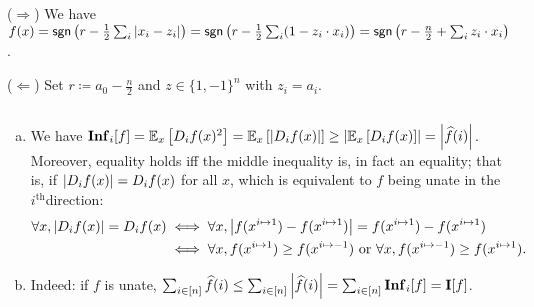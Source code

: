 \documentclass[12pt]{article}
\newcommand{\fbitset}{\{1,-1\}}
\newcommand{\E}[2][]{\mathbb E_{#1}\left[#2\right]}
\newcommand{\Inf}{\mathbf{Inf}}
\newcommand{\I}{\mathbf{I}}
\newcommand{\ith}{$i^\text{th}$}
\newcommand{\hf}{\widehat{f}}
\newcommand{\sumi}{\sum_{i \in [n]}}
\begin{document}
\subsection{}
($\Longrightarrow$) We have $f(x) = \textsf{sgn}\left(r - \frac1{2}\sum_i \abs{x_i - z_i}\right) = \textsf{sgn}\left(r - \frac1{2}\sum_i (1 - z_i \cdot x_i)\right) = \textsf{sgn}\left(r - \frac{n}{2} + \sum_i z_i \cdot x_i\right)$.

\noindent ($\Longleftarrow$) Set $r \coloneqq a_0 - \frac{n}{2}$ and $z \in \fbitset^n$ with $z_i = a_i$.

\subsection{}
\begin{enumerate}[(a)]
    \item We have $\Inf_i[f] = \E[x]{D_i f(x)^2} = \E[x]{\abs{D_i f(x)}} \geq \abs{\E[x]{D_i f(x)}} = \abs{\hf(i)}$. Moreover, equality holds iff the middle inequality is, in fact an equality; that is, if $\abs{D_i f(x)} = D_i f(x)$ for all $x$, which is equivalent to $f$ being unate in the \ith direction:
    \begin{align*}
        \forall x, \abs{D_i f(x)} = D_i f(x) &\iff \forall x, \abs{f(x^{i \mapsto 1}) - f(x^{i \mapsto 1})} = f(x^{i \mapsto 1}) - f(x^{i \mapsto 1})\\
        &\iff \forall x, f(x^{i \mapsto 1}) \geq f(x^{i \mapsto -1}) \text{ or } \forall x, f(x^{i \mapsto -1}) \geq f(x^{i \mapsto 1}).
    \end{align*}
    
    \item Indeed: if $f$ is unate, $\sumi \hf(i) \leq \sumi \abs{\hf(i)} = \sumi \Inf_i [f] = \I[f]$.
\end{enumerate}

\subsection{}

\subsection{}

\subsection{}

\subsection{}
\end{document}
